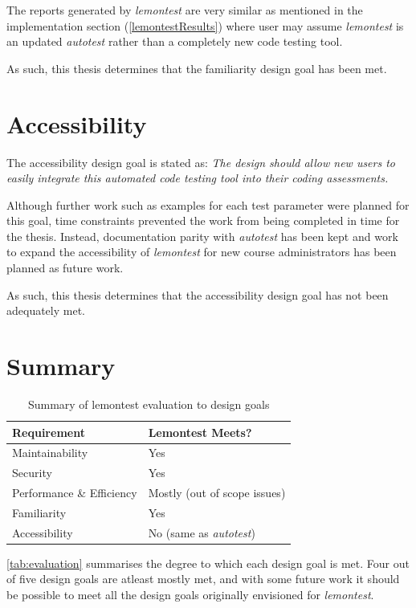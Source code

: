 \documentclass[hidelinks]{report}
\begin{document}
The reports generated by \textit{lemontest} are very similar as mentioned in the implementation section (\autoref{lemontestResults}) where user may assume \textit{lemontest} is an updated \textit{autotest} rather than a completely new code testing tool.

As such, this thesis determines that the familiarity design goal has been met.

\clearpage
\section{Accessibility}
The accessibility design goal is stated as: \textit{The design should allow new users to easily integrate this automated code testing tool into their coding assessments.}

Although further work such as examples for each test parameter were planned for this goal, time constraints prevented the work from being completed in time for the thesis. Instead, documentation parity with \textit{autotest} has been kept and work to expand the accessibility of \textit{lemontest} for new course administrators has been planned as future work.

As such, this thesis determines that the accessibility design goal has not been adequately met.

\section{Summary}
\begin{table}[h]
	\centering
	\begin{tabular}{ll}
		\toprule
		\textbf{Requirement} & \textbf{Lemontest Meets?} \\
		\midrule
		Maintainability  & Yes \\
		Security 		 & Yes\\
		Performance \& Efficiency & Mostly (out of scope issues)\\
		Familiarity      & Yes \\
		Accessibility    & No (same as \textit{autotest}) \\
		\bottomrule
	\end{tabular}
	\caption{Summary of lemontest evaluation to design goals}
	\label{tab:evaluation}
\end{table}
\autoref{tab:evaluation} summarises the degree to which each design goal is met. Four out of five design goals are atleast mostly met, and with some future work it should be possible to meet all the design goals originally envisioned for \textit{lemontest}.
\end{document}
